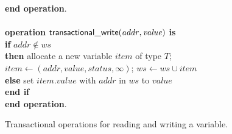 \begin{figure}
{{\begin{minipage}[t]{150mm}
\begin{tabbing}
{\bf end operation}. \\
\\
{\bf operation}  ${\sf transactional\_write}(\mathit{addr, value})$ {\bf is}\\
 \> {\bf if} $\mathit{addr} \not\in \mathit{ws}$  \\
 \>\> {\bf then} \> allocate a new variable $item$ of type $T$; \\
 \>\>\> $\mathit{item}  \gets (\mathit{addr, value, status, \infty})$; 
                   $\mathit{ws} \gets \mathit{ws} \cup \mathit{item}$ \\
 \>\> {\bf else} \> set $\mathit{item.value}$ with $\mathit{addr}$ in $\mathit{ws}$ to $\mathit{value}$ \\
 \> {\bf end if} \\
{\bf end operation}.
\end{tabbing}
\normalsize
\end{minipage}
}
\caption{Transactional operations for reading and writing a variable.}
\label{fig:tops2}
}
\end{figure}







